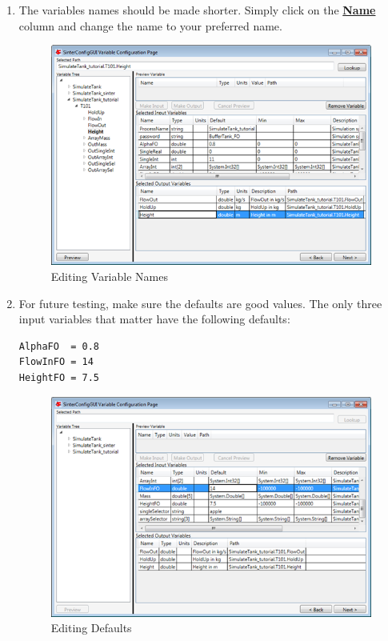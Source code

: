 \begin{enumerate}
\item	The variables names should be made shorter. Simply click on the \textbf{\underline{Name}} column and change the name to your preferred name.

\begin{figure}[H]
	\begin{center}
		\includegraphics[scale=0.55]{Chapt_sinter/figs/gPROMS/23_OutputVariables}
		\caption{Editing Variable Names}
		\label{fig.sinter.gproms.outputs4}
	\end{center}
\end{figure}

\item	For future testing, make sure the defaults are good values.  The only three input variables that matter have the following defaults:

\begin{lstlisting}
AlphaFO  = 0.8
FlowInFO = 14
HeightFO = 7.5
\end{lstlisting}


\begin{figure}[H]
	\begin{center}
		\includegraphics[scale=0.55]{Chapt_sinter/figs/gPROMS/24_Defaults}
		\caption{Editing Defaults}
		\label{fig.sinter.gproms.defaults}
	\end{center}
\end{figure}


\end{enumerate}
